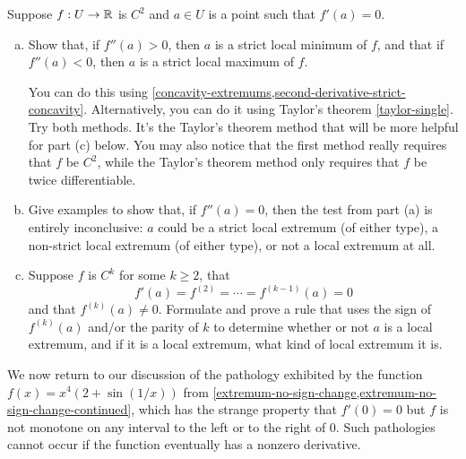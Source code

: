 \begin{exercise}
	Suppose $f : U \to \mathbb{R}$ is $C^2$ and $a \in U$ is a point such that $f'(a) = 0$. 
	\begin{enumerate}[(a)]
		\item Show that, if $f''(a) > 0$, then $a$ is a strict local minimum of $f$, and that if $f''(a) < 0$, then $a$ is a strict local maximum of $f$. 
		\begin{hint}
			You can do this using \cref{concavity-extremums,second-derivative-strict-concavity}. Alternatively, you can do it using Taylor's theorem \ref{taylor-single}. Try both methods. It's the Taylor's theorem method that will be more helpful for part (c) below. You may also notice that the first method really requires that $f$ be $C^2$, while the Taylor's theorem method only requires that $f$ be twice differentiable. 
		\end{hint}
	
		\item Give examples to show that, if $f''(a) = 0$, then the test from part (a) is entirely inconclusive: $a$ could be a strict local extremum (of either type), a non-strict local extremum (of either type), or not a local extremum at all. 
		
		\item Suppose $f$ is $C^k$ for some $k \geq 2$, that 
		\[ f'(a) = f^{(2)} = \dotsb = f^{(k-1)}(a) = 0 \]
		and that $f^{(k)}(a) \neq 0$. Formulate and prove a rule that uses the sign of $f^{(k)}(a)$ and/or the parity of $k$ to determine whether or not $a$ is a local extremum, and if it is a local extremum, what kind of local extremum it is. 
	\end{enumerate}
\end{exercise}

We now return to our discussion of the pathology exhibited by the function $f(x) = x^4 \left( 2 + \sin(1/x) \right)$ from \cref{extremum-no-sign-change,extremum-no-sign-change-continued}, which has the strange property that $f'(0) = 0$ but $f$ is not monotone on any interval to the left or to the right of 0. Such pathologies cannot occur if the function eventually has a nonzero derivative. 


